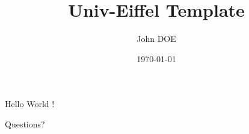 \documentclass[aspectratio=169]{beamer}
\title[]{Univ-Eiffel Template}
\date[]{\today}
\author[]{John DOE}
\institute{Université Gustave Eiffel, INRIA, COSYS/SII, I4S, France}
\begin{document}
	\maketitle

	\begin{frame}{Hello}
		World !
	\end{frame}

	\begin{frame}
		Questions?
	\end{frame}
\end{document}
